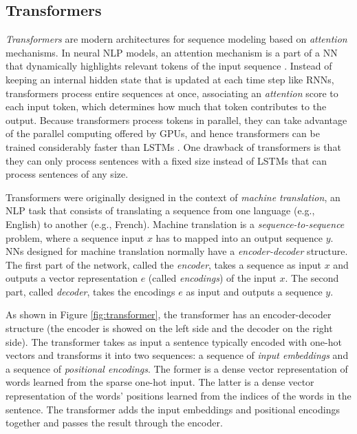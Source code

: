 \subsection{Transformers}

\textit{Transformers} \cite{vaswani2017attention} are modern architectures for sequence modeling based on \textit{attention} mechanisms. In neural NLP models, an attention mechanism is a part of a NN that dynamically highlights relevant tokens of the input sequence \cite{bahdanau2014neural}. Instead of keeping an internal hidden state that is updated at each time step like RNNs, transformers process entire sequences at once, associating an \textit{attention} score to each input token, which determines how much that token contributes to the output. Because transformers process tokens in parallel, they can take advantage of the parallel computing offered by GPUs, and hence transformers can be trained considerably faster than LSTMs \cite{vaswani2017attention}. One drawback of transformers is that they can only process sentences with a fixed size instead of LSTMs that can process sentences of any size.

Transformers were originally designed in the context of \textit{machine translation}, an NLP task that consists of translating a sequence from one language (e.g., English) to another (e.g., French). Machine translation is a \textit{sequence-to-sequence} problem, where a sequence input $x$ has to mapped into an output sequence $y$. NNs designed for machine translation normally have a \textit{encoder-decoder} structure. The first part of the network, called the \textit{encoder}, takes a sequence as input $x$ and outputs a vector representation $e$ (called \textit{encodings}) of the input $x$. The second part, called \textit{decoder}, takes the encodings $e$ as input and outputs a sequence $y$.

As shown in Figure \ref{fig:transformer}, the transformer has an encoder-decoder structure (the encoder is showed on the left side and the decoder on the right side). The transformer takes as input a sentence typically encoded with one-hot vectors and transforms it into two sequences: a sequence of \textit{input embeddings} and a sequence of \textit{positional encodings}. The former is a dense vector representation of words learned from the sparse one-hot input. The latter is a dense vector representation of the words' positions learned from the indices of the words in the sentence. The transformer adds the input embeddings and positional encodings together and passes the result through the encoder.

